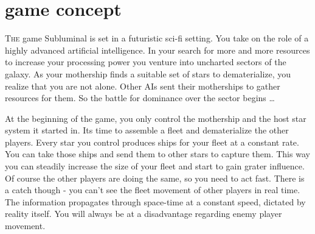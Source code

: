 \chapter{game concept}
\textsc{The} game Subluminal is set in a futuristic sci-fi setting. You take on the role of a highly advanced artificial intelligence. In your search for more and more resources to increase your processing power you venture into uncharted sectors of the galaxy. As your mothership finds a suitable set of stars to dematerialize, you realize that you are not alone. Other AIs sent their motherships to gather resources for them. So the battle for dominance over the sector begins \ldots

At the beginning of the game, you only control the mothership and the host star system it started in. Its time to assemble a fleet and dematerialize the other players. Every star you control produces ships for your fleet at a constant rate. You can take those ships and send them to other stars to capture them. This way you can steadily increase the size of your fleet and start to gain grater influence. Of course the other players are doing the same, so you need to act fast. There is a catch though - you can't see the fleet movement of other players in real time. The information propagates through space-time at a constant speed, dictated by reality itself. You will always be at a disadvantage regarding enemy player movement. 